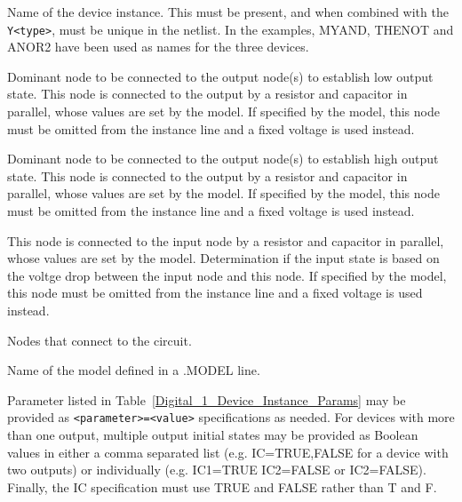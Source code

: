 \begin{Device}
\begin{Parameters}
Name of the device instance.  This must be present, and when combined
with the \texttt{Y<type>}, must be unique in the netlist.  In the
examples, MYAND, THENOT and ANOR2 have been used as names for the three
devices.


Dominant node to be connected to the output node(s) to establish low
output state.  This node is connected to the output by a resistor and
capacitor in parallel, whose values are set by the model.  If specified
by the model, this node must be omitted from the instance line and a
fixed voltage  is used instead.


Dominant node to be connected to the output node(s) to establish high
output state.  This node is connected to the output by a resistor and
capacitor in parallel, whose values are set by the model.  If specified
by the model, this node must be omitted from the instance line and a fixed
voltage  is used instead.


This node is connected to the input node by a resistor and capacitor in
parallel, whose values are set by the model.  Determination if the input
state is based on the voltge drop between the input node and this node.
If specified by the model, this node must be omitted from the instance line and
a fixed voltage  is used instead.


Nodes that connect to the circuit.


Name of the model defined in a .MODEL line.


Parameter listed in Table~\ref{Digital_1_Device_Instance_Params} may be
provided as \texttt{<parameter>=<value>} specifications as needed.  For
devices with more than one output, multiple output initial states may be
provided as Boolean values in either a comma separated list (e.g.
IC=TRUE,FALSE for a device with two outputs) or individually 
(e.g. IC1=TRUE IC2=FALSE or IC2=FALSE).  Finally, the IC specification
must use TRUE and FALSE rather than T and F.


\end{Parameters}
\end{Device}

